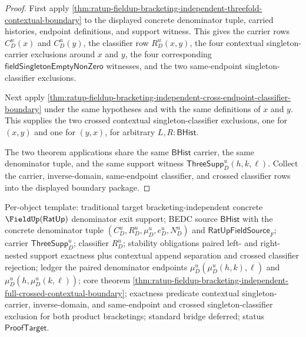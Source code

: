 \begin{proof}
First apply
\autoref{thm:ratup-fieldup-bracketing-independent-threefold-contextual-boundary}
to the displayed concrete denominator tuple, carried histories, endpoint
definitions, and support witness. This gives the carrier rows $C_D^u(x)$ and
$C_D^u(y)$, the classifier row $R_D^u(x,y)$, the four contextual
singleton-carrier exclusions around $x$ and $y$, the four corresponding
$\mathsf{fieldSingletonEmptyNonZero}$ witnesses, and the two same-endpoint
singleton-classifier exclusions.

Next apply
\autoref{thm:ratup-fieldup-bracketing-independent-cross-endpoint-classifier-boundary}
under the same hypotheses and with the same definitions of $x$ and $y$. This
supplies the two crossed contextual singleton-classifier exclusions, one for
$(x,y)$ and one for $(y,x)$, for arbitrary $L,R:\mathsf{BHist}$.

The two theorem applications share the same $\mathsf{BHist}$ carrier, the same
denominator tuple, and the same support witness
$\mathsf{ThreeSupp}_D^u(h,k,\ell)$. Collect the carrier, inverse-domain,
same-endpoint classifier, and crossed classifier rows into the displayed
boundary package.
\end{proof}

Per-object template: traditional target bracketing-independent concrete
$\FieldUp(\mathsf{RatUp})$ denominator exit support; BEDC source
$\mathsf{BHist}$ with the concrete denominator tuple
$(C_D^u,R_D^u,\mu_D^u,e_D^u,N_D^u)$ and $\mathsf{RatUpFieldSource}_F$; carrier
$\mathsf{ThreeSupp}_D^u$; classifier $R_D^u$; stability obligations paired
left- and right-nested support exactness plus contextual append separation and
crossed classifier rejection;
ledger the paired denominator endpoints $\mu_D^u(\mu_D^u(h,k),\ell)$ and
$\mu_D^u(h,\mu_D^u(k,\ell))$; core theorem
\autoref{thm:ratup-fieldup-bracketing-independent-full-crossed-contextual-boundary};
exactness predicate contextual singleton-carrier, inverse-domain, and
same-endpoint and crossed singleton-classifier exclusion for both product
bracketings; standard bridge deferred; status $\mathsf{ProofTarget}$.
